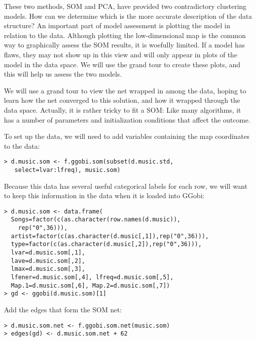These two methods, SOM and PCA, have provided two contradictory
clustering models.  How can we determine which is the more accurate
description of the data structure?  An important part of model
assessment is plotting the model in relation to the data.  Although
plotting the low-dimensional map is the common way to graphically
assess the SOM results, it is woefully limited.  If a model has flaws,
they may not show up in this view and will only appear in plots of
the model in the data space.  We will use the grand tour to create
these plots, and this will help us assess the two models.


We will use a grand tour to view the net wrapped in among the data,
hoping to learn how the net converged to this solution, and how it
wrapped through the data space.  Actually, it is rather tricky to fit
a SOM: Like many algorithms, it has a number of parameters and
initialization conditions that affect the outcome. 

To set up the data, we will need to add variables containing the map
coordinates to the data:

\begin{verbatim}
> d.music.som <- f.ggobi.som(subset(d.music.std,
   select=lvar:lfreq), music.som)
\end{verbatim}

\noindent Because this data has several useful categorical 
labels for each row, we will want to keep this information in the data
when it is loaded into GGobi:

\begin{verbatim}
> d.music.som <- data.frame(
  Songs=factor(c(as.character(row.names(d.music)),
    rep("0",36))),
  artist=factor(c(as.character(d.music[,1]),rep("0",36))),
  type=factor(c(as.character(d.music[,2]),rep("0",36))),
  lvar=d.music.som[,1], 
  lave=d.music.som[,2], 
  lmax=d.music.som[,3],
  lfener=d.music.som[,4], lfreq=d.music.som[,5],
  Map.1=d.music.som[,6], Map.2=d.music.som[,7])
> gd <- ggobi(d.music.som)[1]
\end{verbatim}

\noindent Add the edges that form the SOM net:

\begin{verbatim}
> d.music.som.net <- f.ggobi.som.net(music.som)
> edges(gd) <- d.music.som.net + 62
\end{verbatim}

